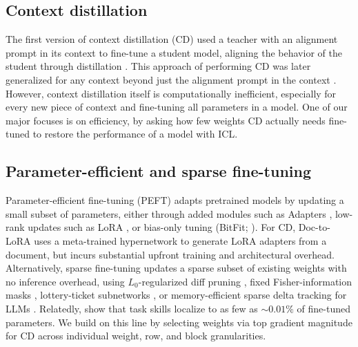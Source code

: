 \documentclass{article} %
\newcommand{\todo}[1]{{\color{red}[TODO: #1]}}
\begin{document}
\subsection{Context distillation}

The first version of context distillation (CD) used a teacher with an alignment prompt in its context to fine-tune a student model, aligning the behavior of the student through distillation \citep{askell2021general}. This approach of performing CD was later generalized for any context beyond just the alignment prompt in the context \citep{snell2022learning}. However, context distillation itself is computationally inefficient, especially for every new piece of context and fine-tuning all parameters in a model. One of our major focuses is on efficiency, by asking how few weights CD actually needs fine-tuned to restore the performance of a model with ICL.


\subsection{Parameter-efficient and sparse fine-tuning}

Parameter-efficient fine-tuning (PEFT) adapts pretrained models by updating a small subset of parameters, either through added modules such as Adapters \citep{houlsby2019parameter}, low-rank updates such as LoRA \citep{hu2022lora}, or bias-only tuning (BitFit; \citealp{zaken2022bitfit}). For CD, Doc-to-LoRA \citep{charakorn2026doctolora} uses a meta-trained hypernetwork to generate LoRA adapters from a document, but incurs substantial upfront training and architectural overhead. Alternatively, sparse fine-tuning updates a sparse subset of existing weights with no inference overhead, using $L_0$-regularized diff pruning \citep{guo2021diffpruning}, fixed Fisher-information masks \citep{sung2021fish}, lottery-ticket subnetworks \citep{ansell2022composable}, or memory-efficient sparse delta tracking for LLMs \citep{ansell2024spiel}. Relatedly, \citet{panigrahi2023skill} show that task skills localize to as few as $\sim 0.01\%$ of fine-tuned parameters. We build on this line by selecting weights via top gradient magnitude for CD across individual weight, row, and block granularities.
\end{document}
